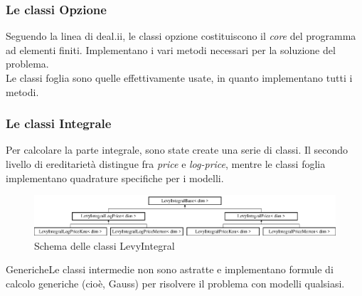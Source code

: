 \documentclass{beamer}
\begin{document}

\begin{frame}[t]
 \frametitle{Le classi Opzione}

 Seguendo la linea di \textsf{deal.ii}, le classi opzione costituiscono il \emph{core} del programma ad elementi finiti. Implementano i vari metodi necessari per la soluzione del problema.\\ Le classi foglia sono quelle effettivamente usate, in quanto implementano tutti i metodi.
 \vspace{1cm}
 \vspace{-0.7cm}
 \vspace{0.3cm}
\end{frame}



\begin{frame}[t]
 \frametitle{Le classi Integrale}
 Per calcolare la parte integrale, sono state create una serie di classi. Il secondo livello di ereditarietà distingue fra \emph{price} e \emph{log-price}, mentre le classi foglia implementano quadrature specifiche per i modelli.

 \begin{figure}
  \centering
  \includegraphics[width=\linewidth]{classLevyIntegralBase}
 \caption{Schema delle classi LevyIntegral}
 \end{figure}
 \pause
 \begin{block}{Generiche}{Le classi intermedie non sono astratte e implementano formule di calcolo generiche (cio\`e, Gauss) per risolvere il problema con modelli qualsiasi.}

 \end{block}
\end{frame}
\end{document}
